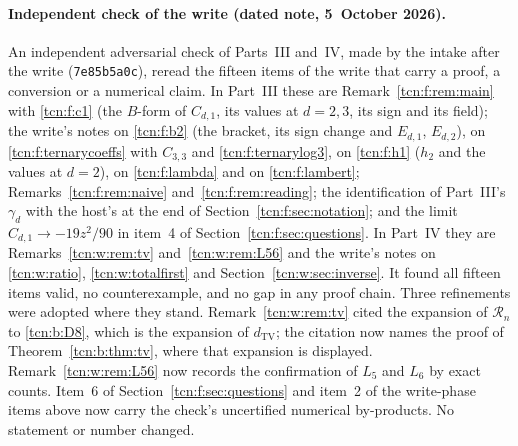 \documentclass[11pt,letterpaper]{article}
\theoremstyle{remark}
\begin{document}
\paragraph{Independent check of the write (dated note, 5~October 2026).}
An independent adversarial check of Parts~III and~IV, made by the intake after the write (\texttt{7e85b5a0c}), reread the fifteen items of the write that carry a proof, a conversion or a numerical claim. In Part~III these are Remark~\ref{tcn:f:rem:main} with \eqref{tcn:f:c1} (the $B$-form of $C_{d,1}$, its values at $d=2,3$, its sign and its field); the write's notes on \eqref{tcn:f:b2} (the bracket, its sign change and $E_{d,1}$, $E_{d,2}$), on \eqref{tcn:f:ternarycoeffs} with $C_{3,3}$ and \eqref{tcn:f:ternarylog3}, on \eqref{tcn:f:h1} ($h_2$ and the values at $d=2$), on \eqref{tcn:f:lambda} and on \eqref{tcn:f:lambert}; Remarks~\ref{tcn:f:rem:naive} and~\ref{tcn:f:rem:reading}; the identification of Part~III's $\gamma_d$ with the host's at the end of Section~\ref{tcn:f:sec:notation}; and the limit $C_{d,1}\to-19z^2/90$ in item~4 of Section~\ref{tcn:f:sec:questions}. In Part~IV they are Remarks~\ref{tcn:w:rem:tv} and~\ref{tcn:w:rem:L56} and the write's notes on \eqref{tcn:w:ratio}, \eqref{tcn:w:totalfirst} and Section~\ref{tcn:w:sec:inverse}. It found all fifteen items valid, no counterexample, and no gap in any proof chain. Three refinements were adopted where they stand. Remark~\ref{tcn:w:rem:tv} cited the expansion of $\mathcal R_n$ to \eqref{tcn:b:D8}, which is the expansion of $d_{\mathrm{TV}}$; the citation now names the proof of Theorem~\ref{tcn:b:thm:tv}, where that expansion is displayed. Remark~\ref{tcn:w:rem:L56} now records the confirmation of $L_5$ and $L_6$ by exact counts. Item~6 of Section~\ref{tcn:f:sec:questions} and item~2 of the write-phase items above now carry the check's uncertified numerical by-products. No statement or number changed.
\end{document}
